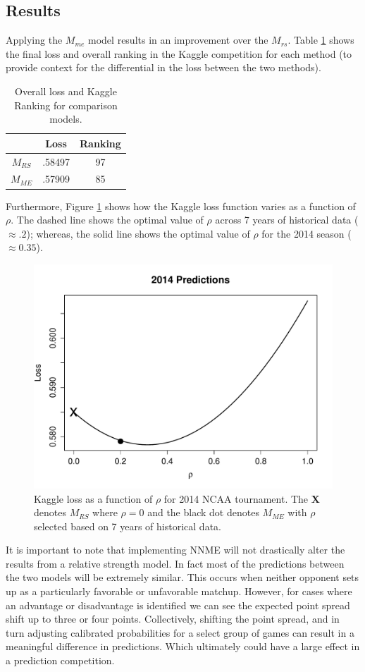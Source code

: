 \documentclass[letterpaper,12pt]{article}
\begin{document}
 \subsection{Results}
Applying the $M_{me}$ model results in an improvement over the $M_{rs}$. Table \ref{tab:results} shows the final loss and overall ranking in the Kaggle competition for each method (to provide context for the differential in the loss between the two methods).
\begin{table}[h!]
\caption{Overall loss and Kaggle Ranking for comparison models.\label{tab:results}}
\centering
\begin{tabular}{|c|cc|}
  \hline
    & Loss & Ranking\\ 
  \hline
  $M_{RS}$ & .58497 & 97 \\
  $M_{ME}$ & .57909 & 85 \\
   \hline
   \hline
\end{tabular}
\end{table}
Furthermore, Figure \ref{fig:result} shows how the Kaggle loss function varies as a function of $\rho$. The dashed line shows the optimal value of $\rho$ across 7 years of historical data ($\approx .2$); whereas, the solid line shows the optimal value of $\rho$ for the 2014 season ($\approx 0.35$). 
\begin{figure}[h!]
\centering
\includegraphics[width=.8\textwidth]{Predictions.pdf}
\caption{Kaggle loss as a function of $\rho$ for 2014 NCAA tournament. The {\bf X} denotes $M_{RS}$ where $\rho = 0$ and the black dot denotes $M_{ME}$ with $\rho$ selected based on 7 years of historical data.}
\label{fig:result}
\end{figure} 

It is important to note that implementing NNME will not drastically alter the results from a relative strength model. In fact most of the predictions between the two models will be extremely similar. This occurs when neither opponent sets up as a particularly favorable or unfavorable matchup. However, for cases where an advantage or disadvantage is identified we can see the expected point spread shift up to three or four points. Collectively, shifting the point spread, and in turn adjusting calibrated probabilities for a select group of games can result in a meaningful difference in predictions. Which ultimately could have a large effect in a prediction competition.
\end{document}
